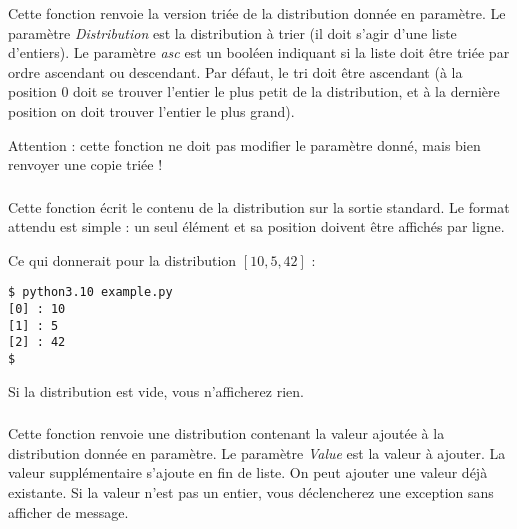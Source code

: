 \noindent Cette fonction renvoie la version triée de la distribution donnée en paramètre.
Le paramètre \textit{Distribution} est la distribution à trier (il doit s'agir d'une liste d'entiers).
Le paramètre \textit{asc} est un booléen indiquant si la liste doit être triée par ordre ascendant ou descendant.
Par défaut, le tri doit être ascendant (à la position $ 0 $ doit se trouver l'entier le plus petit de la distribution, et à la dernière position on doit trouver l'entier le plus grand).

\medskip

\noindent Attention : cette fonction ne doit pas modifier le paramètre donné, mais bien renvoyer une copie triée !


\subsubsection*{}

\noindent Cette fonction écrit le contenu de la distribution sur la sortie standard.
Le format attendu est simple : un seul élément et sa position doivent être affichés par ligne.

\bigskip

\noindent {}

\bigskip

\noindent Ce qui donnerait pour la distribution $ [ 10, 5, 42 ] $ :

\lstset{language=sh}
\begin{lstlisting}[frame=single]
$ python3.10 example.py
[0] : 10
[1] : 5
[2] : 42
$
\end{lstlisting}

\bigskip

\noindent Si la distribution est vide, vous n'afficherez rien.



\subsubsection*{}

\noindent Cette fonction renvoie une distribution contenant la valeur ajoutée à la distribution donnée en paramètre.
Le paramètre \textit{Value} est la valeur à ajouter.
La valeur supplémentaire s'ajoute en fin de liste.
On peut ajouter une valeur déjà existante.
Si la valeur n'est pas un entier, vous déclencherez une exception  sans afficher de message.

